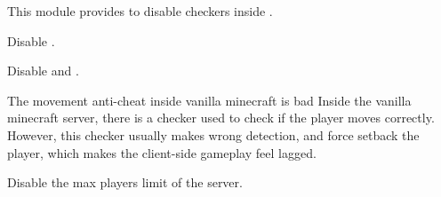 This module provides  to disable checkers inside .

Disable .

Disable  and .

\begin{warn}{The movement anti-cheat inside vanilla minecraft is bad}
    Inside the vanilla minecraft server, there is a checker used to check if the player moves correctly.
    However, this checker usually makes wrong detection, and force setback the player, which makes the client-side gameplay feel lagged.
\end{warn}

Disable the max players limit of the server.